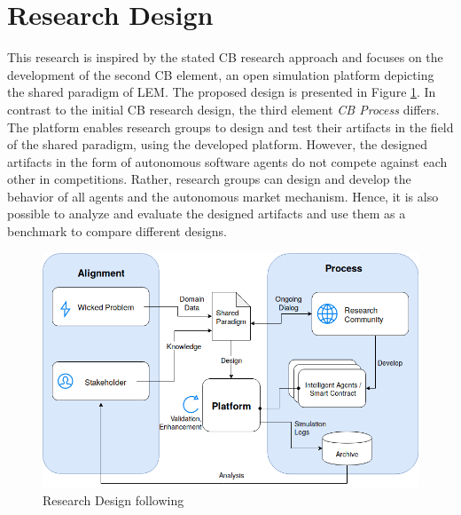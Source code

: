 \section{Research Design}
\label{sec:research_design}

This research is inspired by the stated CB research approach and focuses on the development of 
the second CB element, an open simulation platform depicting the shared paradigm of LEM. 
The proposed design is presented in Figure \ref{figure:competitive_benchmarking}. 
In contrast to the initial CB research design, the third element \textit{CB Process} differs. 
The platform enables research groups to design and test their artifacts in the field of the shared 
paradigm, using the developed platform. However, the designed artifacts in the form of autonomous 
software agents do not compete against each other in competitions. 
Rather, research groups can design and develop the behavior of all agents and the 
autonomous market mechanism. Hence, it is also possible to analyze and evaluate the designed 
artifacts and use them as a benchmark to compare different designs. 

\begin{figure}[htbp]
	\centering
	\includegraphics[width=1\linewidth]{./figures/competitive_benchmarking.png}
	\caption{Research Design following \protect{}}
	\label{figure:competitive_benchmarking}
\end{figure}

